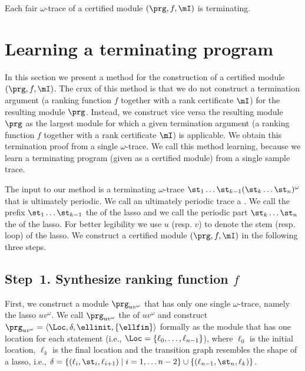 \begin{theorem}[soundness]
\label{thm:soundness}
Each fair $\omega$-trace of a certified module $(\prg,f,\mI)$ is terminating.
\end{theorem}



















\section{Learning a terminating program}
\label{sec:automatic-module}

In this section we present a method for the construction of a certified module $(\prg, f, \mI)$.
The crux of this method is that we do not construct a termination argument (a ranking function $f$ together with a rank certificate $\mI$) for the resulting module $\prg$.
Instead, we construct vice versa the resulting module $\prg$ as the largest module for which a given termination argument (a ranking function $f$ together with a rank certificate $\mI$) is applicable.
We obtain this termination proof from a single  $\omega$-trace.
We call this method learning, because we learn a terminating program (given as a certified module) from a single sample trace.


The input to our method is a terminating $\omega$-trace $\st_1\dots\st_{k-1} ( \st_k\dots\st_{n} )^\omega $ that is ultimately periodic. 
We call an ultimately periodic trace a .
We call the prefix $\st_1\dots\st_{k-1}$ the  of the lasso and we call the periodic part $\st_k\dots\st_{n}$ the  of the lasso. 
For better legibility we use $u$ (resp. $v$) to denote the stem (resp. loop) of the lasso.
We construct a certified module $(\prg,f,\mI)$ in the following three steps. 

\subsection*{Step~1. Synthesize ranking function $f$}
First, we construct a module $\prg_{uv^\omega}$ that has only one single $\omega$-trace, namely the lasso $uv^\omega$. We call $\prg_{uv^\omega}$ the  of $uv^\omega$ and construct $\prg_{uv^\omega}=\langle \Loc,\delta, \ellinit, \{\ellfin\} \rangle$ formally as the module that has one location for each statement (i.e., $ \Loc=\{\ell_0,\dots,\ell_{n-1}\}$), where $\ell_0$ is the initial location, $\ell_k$ is the final location and the transition graph resembles the shape of a lasso, i.e., 
$\delta = \{ (\ell_i,\st_i,\ell_{i+1}) \mid i=1,\dots n-2\} \cup \{ (\ell_{n-1},\st_n,\ell_{k})\}$.

